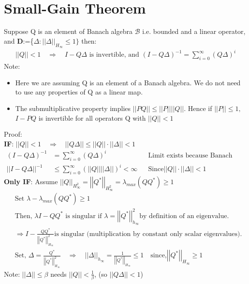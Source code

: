\documentclass{article}[12pt]
\newcommand{\norm}[1]{\left|\left|#1\right|\right|}
\begin{document}
\section{Small-Gain Theorem}
Suppose Q is an element of Banach algebra $\mathcal{B}$ i.e. bounded and a linear operator, and \textbf{D}:=\{$\Delta: \norm{\Delta}_{H_{\infty}}\leq 1\}$  then:
\begin{align*}
    \norm{Q} < 1 \quad \Longrightarrow \quad I-Q\Delta \text{ is invertible, and } (I-Q\Delta)^{-1} = \sum_{i=0}^{\infty} (Q\Delta)^i
\end{align*}
Note:
\begin{itemize}
    \item Here we are assuming Q is an element of a Banach algebra. We do not need to use any properties of Q as a linear map.
    \item The submultiplicative property implies $\norm{PQ} \leq \norm{P}\norm{Q}$. Hence if $\norm{P} \leq 1,$ \quad $I-PQ$ is invertible for all operators Q with $\norm{Q} < 1$
\end{itemize}
Proof:\\
\textbf{IF}: $\norm{Q}<1 \quad \Longrightarrow \quad \norm{Q\Delta} \leq \norm{Q}\cdot\norm{\Delta}<1$
\begin{align*}
    (I - Q\Delta)^{-1} &= \sum^{\infty}_{i=0}(Q\Delta)^i &&\text{Limit exists because Banach algebra}\\
    \norm{I-Q\Delta}^{-1} &\leq \sum^{\infty}_{i=0}(\norm{Q}\norm{\Delta})^i< \infty && \text{Since} \norm{Q}\cdot\norm{\Delta}<1
\end{align*}
\textbf{Only IF}: Assume $\norm{Q}_{H_{\infty}^2} = \norm{Q^*}_{H_{\infty}^2} = \lambda_{max}(QQ^*)\geq 1$\\
\begin{align*}
    &\text{Set }\lambda - \lambda_{max}(QQ^*)\geq 1\\
    &\text{Then, }\lambda I - Q Q^* \text{ is singular if }\lambda = \norm{Q^*}_{h_{\infty}}^2 \text{by definition of an eigenvalue.}\\
    &\Longrightarrow I-\frac{QQ^*}{\norm{Q^*}^2_{H_{\infty}}} \text{is singular (multiplication by constant only scalar eigenvalues).}\\
    &\text{Set, } \Delta = \frac{Q^*}{\norm{Q^*}^2_{H_{\infty}}}\quad \Longrightarrow \quad  \norm{\Delta}_{h_{\infty}} = \frac{1}{\norm{Q^*}_{H_{\infty}}} \leq 1 \quad \text{since,} \norm{Q^*}_{H_{\infty}} \geq 1
\end{align*}
Note: $\norm{\Delta}\leq \beta$ needs $\norm{Q}< \frac{1}{\beta}$, (so $\norm{Q\Delta}<1$)
\end{document}
